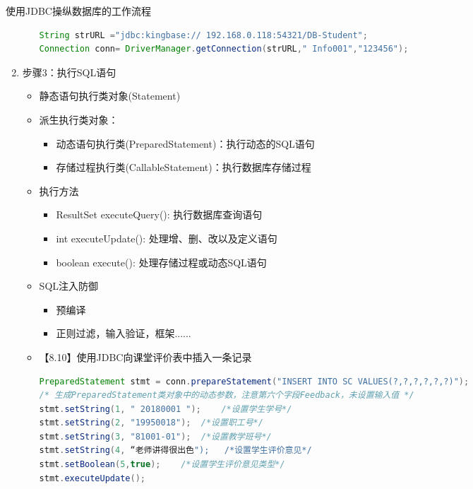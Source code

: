 \begin{frame}{使用JDBC操纵数据库的工作流程}
\begin{enumerate}
\begin{itemize}
\begin{block}{}
\begin{lstlisting}[language=Java, linewidth=\textwidth]
String strURL ="jdbc:kingbase:// 192.168.0.118:54321/DB-Student";
Connection conn= DriverManager.getConnection(strURL," Info001","123456");
\end{lstlisting}
\end{block}
\end{itemize}
    \framebreak
    \item 步骤3：执行SQL语句
    \begin{itemize}
        \item 静态语句执行类对象(Statement)
        \item 派生执行类对象：
            \begin{itemize}
                \item 动态语句执行类(PreparedStatement)：执行动态的SQL语句
                \item 存储过程执行类(CallableStatement)：执行数据库存储过程
            \end{itemize}
        \item 执行方法
            \begin{itemize}
                \item ResultSet executeQuery(): 执行数据库查询语句
                \item int executeUpdate(): 处理增、删、改以及定义语句
                \item boolean execute(): 处理存储过程或动态SQL语句
            \end{itemize}
        \item SQL注入防御
        \begin{itemize}
            \item 预编译
            \item 正则过滤，输入验证，框架......
        \end{itemize}
    \framebreak
        \item 【8.10】使用JDBC向课堂评价表中插入一条记录
\begin{block}{}
\begin{lstlisting}[language=Java, linewidth=\textwidth]
PreparedStatement stmt = conn.prepareStatement("INSERT INTO SC VALUES(?,?,?,?,?,?)");
/* 生成PreparedStatement类对象中的动态参数，注意第六个字段Feedback，未设置输入值 */
stmt.setString(1, " 20180001 ");    /*设置学生学号*/
stmt.setString(2, "19950018");  /*设置职工号*/
stmt.setString(3, "81001-01");  /*设置教学班号*/
stmt.setString(4, “老师讲得很出色");   /*设置学生评价意见*/
stmt.setBoolean(5,true);    /*设置学生评价意见类型*/
stmt.executeUpdate();
\end{lstlisting}
\end{block}    \end{itemize}



\end{enumerate}
\end{frame}
